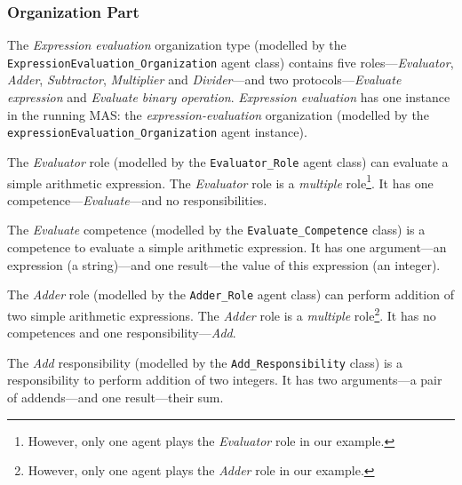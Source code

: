 \subsubsection*{Organization Part}

The \textit{Expression evaluation} organization type (modelled by the \texttt{ExpressionEvaluation\_Organization} agent class) contains five roles---\textit{Evaluator}, \textit{Adder}, \textit{Subtractor}, \textit{Multiplier} and \textit{Divider}---and two protocols---\textit{Evaluate expression} and \textit{Evaluate binary operation}.
\textit{Expression evaluation} has one instance in the running MAS: the \textit{expression-evaluation} organization (modelled by the \texttt{expressionEvaluation\_Organization} agent instance).

The \textit{Evaluator} role (modelled by the \texttt{Evaluator\_Role} agent class) can evaluate a simple arithmetic expression.
The \textit{Evaluator} role is a \textit{multiple} role\footnote{However, only one agent plays the \textit{Evaluator} role in our example.}.
It has one competence---\textit{Evaluate}---and no responsibilities.

The \textit{Evaluate} competence (modelled by the \texttt{Evaluate\_Competence} class) is a competence to evaluate a simple arithmetic expression.
It has one argument---an expression (a string)---and one result---the value of this expression (an integer).

The \textit{Adder} role (modelled by the \texttt{Adder\_Role} agent class) can perform addition of two simple arithmetic expressions.
The \textit{Adder} role is a \textit{multiple} role\footnote{However, only one agent plays the \textit{Adder} role in our example.}.
It has no competences and one responsibility---\textit{Add}.

The \textit{Add} responsibility (modelled by the \texttt{Add\_Responsibility} class) is a responsibility to perform addition of two integers.
It has two arguments---a pair of addends---and one result---their sum.

